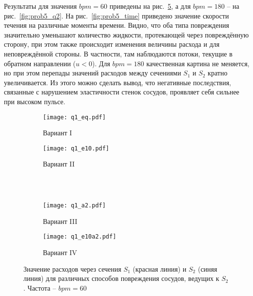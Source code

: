 Результаты для значения $bpm=60$ приведены на рис.~\ref{fig:prob5_q1}, а для $bpm=180$ -- на рис.~\ref{fig:prob5_q2}.
На рис.~\ref{fig:prob5_time} приведено значение скорости течения на различные моменты времени.
Видно, что оба типа повреждения значительно уменьшают количество
жидкости, протекающей через повреждённую сторону, при этом также происходит
изменения величины расхода и для неповреждённой стороны. В частности, там наблюдаются потоки, текущие в обратном направлении ($u<0$).
Для $bpm=180$ качественная картина не меняется, но при этом перепады значений расходов между сечениями $S_1$ и $S_2$
кратно увеличивается.
Из этого можно сделать вывод, что негативные последствия, связанные с нарушением эластичности стенок сосудов, проявляет себя сильнее при
высоком пульсе.

\begin{figure}[h!]
\begin{subfigure}{0.5\linewidth}\centering
\texttt{[image: q1\_eq.pdf]}
\caption{Вариант I}\label{fig:prob5_q1_eq}
\end{subfigure}%
\begin{subfigure}{0.5\linewidth}\centering
\texttt{[image: q1\_e10.pdf]}
\caption{Вариант II}\label{fig:prob5_q1_e10}
\end{subfigure} \\
\hfill \\
\begin{subfigure}{0.5\linewidth}\centering
\texttt{[image: q1\_a2.pdf]}
\caption{Вариант III}\label{fig:prob5_q1_a2}
\end{subfigure}%
\begin{subfigure}{0.5\linewidth}\centering
\texttt{[image: q1\_e10a2.pdf]}
\caption{Вариант IV}\label{fig:prob5_a1_e10a2}
\end{subfigure}%
\caption{Значение расходов через сечения $S_1$ (красная линия) и $S_2$ (синяя линия) для различных способов повреждения сосудов, ведущих к $S_2$. Частота -- $bpm=60$}
\label{fig:prob5_q1}
\end{figure}


